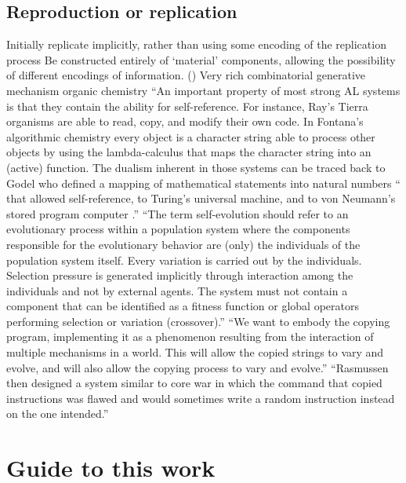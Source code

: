 \begin{NOTES}
\subsection{Reproduction or replication}\label{reproduction-or-replication}
Initially replicate implicitly, rather than using some encoding of the replication process  \parencite{Taylor2001}
Be constructed entirely of `material' components, allowing the possibility of different encodings of information. ()
Very rich combinatorial generative mechanism \eg organic chemistry \parencite{Vasas2015}
``An important property of most strong AL systems is that they contain the ability for self-reference. For instance, Ray's Tierra organisms are able to read, copy, and modify their own code. In Fontana's algorithmic chemistry every object is a character string able to process other objects by using the lambda-calculus that maps the character string into an (active) function. The dualism inherent in those systems can be traced back to Godel who defined a mapping of mathematical statements into natural numbers `` that allowed self-reference, to Turing's universal machine, and to von Neumann's stored program computer .''\parencite{Dittrich1998}
``The term self-evolution should refer to an evolutionary process within a population system where the components responsible for the evolutionary behavior are (only) the individuals of the population
system itself. Every variation is carried out by the individuals. Selection pressure is generated implicitly through interaction among the individuals and not by external agents. The system must not contain a component that can be identified as a fitness function or global operators performing selection or variation (\eg crossover).'' \cite{Dittrich1998}
``We want to embody the copying program, implementing it as a phenomenon resulting from the interaction of multiple mechanisms in a world. This will allow the copied strings to vary and evolve, and will also allow the copying process to vary and evolve.'' \cite{Nellis2014}
``Rasmussen then designed a system similar to core war in which the command that copied instructions was flawed and would sometimes write a random instruction instead on the one intended.'' \parencite{Ofria2004}
\end{NOTES}

\section{Guide to this work}

